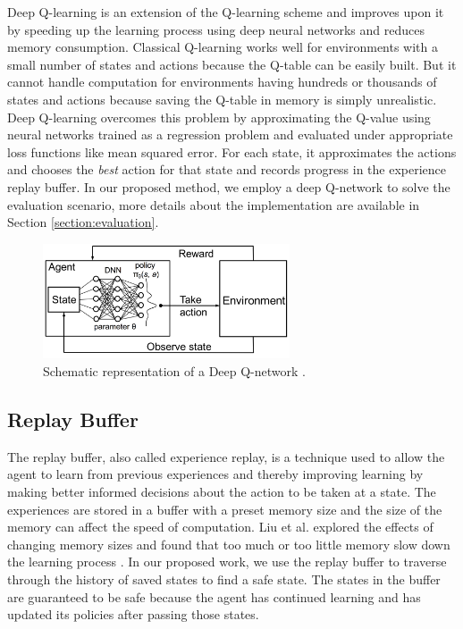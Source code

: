 \documentclass[acmsmall,review,authorversion]{acmart}
\begin{document}
Deep Q-learning is an extension of the Q-learning scheme and improves upon it by speeding up the learning process using deep neural networks and reduces memory consumption. Classical Q-learning works well for environments with a small number of states and actions because the Q-table can be easily built. But it cannot handle computation for environments having hundreds or thousands of states and actions because saving the Q-table in memory is simply unrealistic. Deep Q-learning overcomes this problem by approximating the Q-value using neural networks trained as a regression problem and evaluated under appropriate loss functions like mean squared error. For each state, it approximates the actions and chooses the \emph{best} action for that state and records progress in the experience replay buffer. In our proposed method, we employ a deep Q-network to solve the evaluation scenario, more details about the implementation are available in Section \ref{section:evaluation}.

    \begin{figure}[ht]
        \centering
        \includegraphics[width=0.65\textwidth]{assets/dqn.png}
        \caption{Schematic representation of a Deep Q-network \cite{10.1145/3005745.3005750}.}
        \label{fig:DQ_schem}
    \end{figure}

\subsection{Replay Buffer}
\label{sub:replay}
The replay buffer, also called experience replay, is a technique used to allow the agent to learn from previous experiences and thereby improving learning by making better informed decisions about the action to be taken at a state. The experiences are stored in a buffer with a preset memory size and the size of the memory can affect the speed of computation. Liu et al. explored the effects of changing memory sizes and found that too much or too little memory slow down the learning process \cite{DBLP:journals/corr/abs-1710-06574}. In our proposed work, we use the replay buffer to traverse through the history of saved states to find a safe state. The states in the buffer are guaranteed to be safe because the agent has continued learning and has updated its policies after passing those states.
\end{document}
